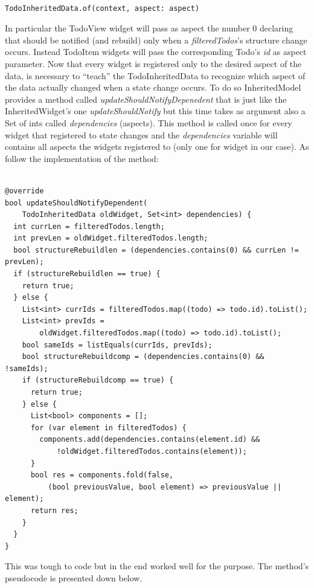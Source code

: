 \begin{verbatim}

TodoInheritedData.of(context, aspect: aspect)
\end{verbatim}

In particular the TodoView widget will pass as aspect the number 0 declaring that should be notified (and rebuild) only when a \textit{filteredTodos}’s structure change occurs.
Instead TodoItem widgets will pass the corresponding Todo’s \textit{id} as aspect parameter.
Now that every widget is registered only to the desired aspect of the data, is necessary to “teach” the TodoInheritedData to recognize which aspect of the data actually changed when a state change occurs. To do so InheritedModel provides a method called \textit{updateShouldNotifyDepenedent} that is just like the InheritedWidget’s one \textit{updateShouldNotify }but this time takes as argument also a Set of ints called \textit{dependencies }  (aspects). This method is called once for every widget that registered to state changes and the \textit{dependencies }  variable will contains all aspects the widgets registered to (only one for widget in our case). As follow the implementation of the method:
\mbox{}\\


\begin{verbatim}

@override
bool updateShouldNotifyDependent(
    TodoInheritedData oldWidget, Set<int> dependencies) {
  int currLen = filteredTodos.length;
  int prevLen = oldWidget.filteredTodos.length;
  bool structureRebuildlen = (dependencies.contains(0) && currLen != prevLen);
  if (structureRebuildlen == true) {
    return true;
  } else {
    List<int> currIds = filteredTodos.map((todo) => todo.id).toList();
    List<int> prevIds =
        oldWidget.filteredTodos.map((todo) => todo.id).toList();
    bool sameIds = listEquals(currIds, prevIds);
    bool structureRebuildcomp = (dependencies.contains(0) && !sameIds);
    if (structureRebuildcomp == true) {
      return true;
    } else {
      List<bool> components = [];
      for (var element in filteredTodos) {
        components.add(dependencies.contains(element.id) &&
            !oldWidget.filteredTodos.contains(element));
      }
      bool res = components.fold(false,
          (bool previousValue, bool element) => previousValue || element);
      return res;
    }
  }
}
\end{verbatim}

This was tough to code but in the end worked well for the purpose. The method's pseudocode is presented down below. 

